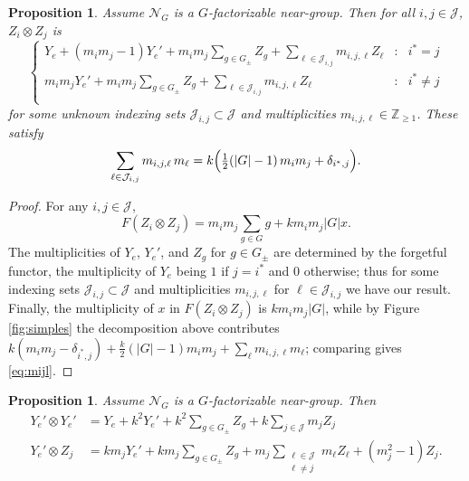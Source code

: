 \documentclass[10pt]{article}
\theoremstyle{plain}
\newtheorem{proposition}[theorem]{Proposition}
\theoremstyle{definition}
\theoremstyle{plain}
\begin{document}
\begin{proposition}\label{zfusion}
    Assume $\mathcal{N}_G$ is a $G$-factorizable near-group.  Then for all $i,j\in\mathcal{J}$, $Z_i\otimes Z_j$ is
    \begin{equation}
\left\{\begin{array}{ccc}
Y_e+(m_im_j-1)Y_e'+m_im_j\displaystyle{\sum_{g\in G_{\pm}}}Z_g+\displaystyle{\sum_{\ell\in\mathcal{J}_{i,j}}}m_{i,j,\ell}Z_\ell & : & i^\ast=j\\
m_im_jY_e'+m_im_j\displaystyle{\sum_{g\in G_{\pm}}}Z_g+\displaystyle{\sum_{\ell\in\mathcal{J}_{i,j}}}m_{i,j,\ell}Z_\ell &:  & i^\ast\neq j \\
\end{array}
\right.
\end{equation}
for some unknown indexing sets $\mathcal{J}_{i,j}\subset\mathcal{J}$ and multiplicities $m_{i,j,\ell}\in\mathbb{Z}_{\geq1}$. These satisfy
\begin{equation}\label{eq:mijl}
\sum_{\ell\in\mathcal{J}_{i,j}}m_{i,j,\ell}\,m_\ell=k\Bigl(\tfrac12(|G|-1)\,m_im_j+\delta_{i^\ast,j}\Bigr).
\end{equation}
\end{proposition}

\begin{proof}
For any $i,j\in\mathcal{J}$,
\begin{equation}
F(Z_i\otimes Z_j)=m_im_j\sum_{g\in G}g+km_im_j|G|x.
\end{equation}
The multiplicities of $Y_e$, $Y_e'$, and $Z_g$ for $g\in G_{\pm}$ are determined by the forgetful functor, the multiplicity of $Y_e$ being $1$ if $j=i^\ast$ and $0$ otherwise; thus for some indexing sets $\mathcal{J}_{i,j}\subset\mathcal{J}$ and multiplicities $m_{i,j,\ell}$ for $\ell\in \mathcal{J}_{i,j}$ we have our result. Finally, the multiplicity of $x$ in $F(Z_i\otimes Z_j)$ is $km_im_j|G|$, while by Figure \ref{fig:simples} the decomposition above contributes $k(m_im_j-\delta_{i^\ast,j})+\tfrac k2(|G|-1)m_im_j+\sum_\ell m_{i,j,\ell}m_\ell$; comparing gives \eqref{eq:mijl}.
\end{proof}

\begin{proposition}\label{prop:yeprime}
    Assume $\mathcal{N}_G$ is a $G$-factorizable near-group.  Then
    \begin{align}
        Y_e'\otimes Y_e'&=Y_e+k^2Y_e'+k^2\sum_{g\in G_{\pm}}Z_g+k\sum_{j\in\mathcal{J}}m_jZ_j \\
        Y_e'\otimes Z_j&=km_jY_e'+km_j\sum_{g\in G_{\pm}}Z_g+m_j\sum_{\substack{\ell\in\mathcal{J}\\ \ell\neq j}}m_\ell Z_\ell+(m_j^2-1)Z_j.
    \end{align}
\end{proposition}
\end{document}
